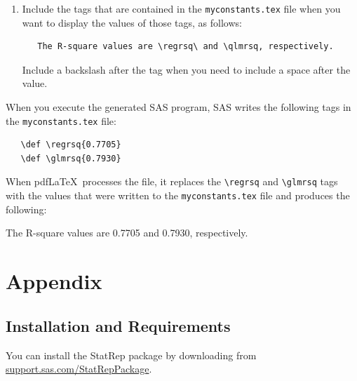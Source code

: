 \documentclass[article,oneside]{memoir}
\newcommand*{\StatRep}{\textsf{StatRep}\xspace}
\begin{document}
\begin{enumerate}
\item Include the tags that are contained
     in the \texttt{myconstants.tex} file when you want to display
     the values of those tags, as follows:
\begin{snugshade}
\begin{verbatim}
   The R-square values are \regrsq\ and \qlmrsq, respectively.
\end{verbatim}
\end{snugshade}
   Include a backslash after the tag when you need to include a space after the value.
\end{enumerate}

When you execute the generated SAS program, SAS writes the
following tags in the \texttt{myconstants.tex} file:
\begin{snugshade}
\begin{verbatim}
   \def \regrsq{0.7705}
   \def \glmrsq{0.7930}
\end{verbatim}
\end{snugshade}

When pdf\LaTeX\ processes the file, it replaces the
\verb+\regrsq+ and \verb+\glmrsq+ tags with the values that were
written to the \texttt{myconstants.tex} file and produces the
following:
\begin{snugshade}
   The R-square values are 0.7705 and 0.7930, respectively.
\end{snugshade}

\chapter{Appendix}

\section{Installation and Requirements}\label{install}
You can install the \StatRep package by downloading  from \url{support.sas.com/StatRepPackage}.
\end{document}
